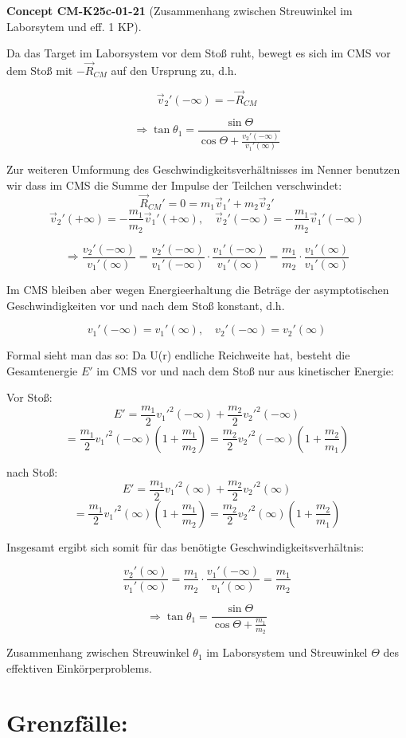 \documentclass[10pt, letterpaper]{article}
\newcommand{\CustomHeading}[3]{%
  \par\medskip\noindent%
  \textbf{#1 #2} \textnormal{(#3)}.\enskip%
}
\newenvironment{CONC}[2]{\begin{unitbox}\CustomHeading{Concept}{#1}{#2}}{\end{unitbox}}
\begin{document}
\begin{CONC}{CM-K25c-01-21}{Zusammenhang zwischen Streuwinkel im Laborsytem und eff. 1 KP}
Da das Target im Laborsystem vor dem Stoß ruht, bewegt es sich im CMS vor dem Stoß mit $-\vec{R}_{CM}$ auf den Ursprung zu, d.h.

\[\vec{v}_2'(-\infty) = -\vec{R}_{CM}\]

\[\Rightarrow \tan\theta_1 = \frac{\sin\Theta}{\cos\Theta + \frac{v_2'(-\infty)}{v_1'(\infty)}}\]

Zur weiteren Umformung des Geschwindigkeitsverhältnisses im Nenner benutzen wir dass im CMS die Summe der Impulse der Teilchen verschwindet:
\[\vec{R}_{CM}' = 0 = m_1\vec{v}_1' + m_2\vec{v}_2'\]
\[\vec{v}_2'(+\infty) = -\frac{m_1}{m_2}\vec{v}_1'(+\infty), \quad \vec{v}_2'(-\infty) = -\frac{m_1}{m_2}\vec{v}_1'(-\infty)\]

\[\Rightarrow \frac{v_2'(-\infty)}{v_1'(\infty)} = \frac{v_2'(-\infty)}{v_1'(-\infty)}\cdot\frac{v_1'(-\infty)}{v_1'(\infty)} = \frac{m_1}{m_2}\cdot\frac{v_1'(\infty)}{v_1'(\infty)}\]

Im CMS bleiben aber wegen Energieerhaltung die Beträge der asymptotischen Geschwindigkeiten vor und nach dem Stoß konstant, d.h.

\[v_1'(-\infty) = v_1'(\infty), \quad v_2'(-\infty) = v_2'(\infty)\]

Formal sieht man das so: Da U(r) endliche Reichweite hat, besteht die Gesamtenergie $E'$ im CMS vor und nach dem Stoß nur aus kinetischer Energie:

Vor Stoß:
\[E' = \frac{m_1}{2}v_1'^2(-\infty) + \frac{m_2}{2}v_2'^2(-\infty)\]
\[= \frac{m_1}{2}v_1'^2(-\infty)\left(1+\frac{m_1}{m_2}\right) = \frac{m_2}{2}v_2'^2(-\infty)\left(1+\frac{m_2}{m_1}\right)\]

nach Stoß:
\[E' = \frac{m_1}{2}v_1'^2(\infty) + \frac{m_2}{2}v_2'^2(\infty)\]
\[= \frac{m_1}{2}v_1'^2(\infty)\left(1+\frac{m_1}{m_2}\right) = \frac{m_2}{2}v_2'^2(\infty)\left(1+\frac{m_2}{m_1}\right)\]

Insgesamt ergibt sich somit für das benötigte Geschwindigkeitsverhältnis:

\[\frac{v_2'(\infty)}{v_1'(\infty)} = \frac{m_1}{m_2}\cdot\frac{v_1'(-\infty)}{v_1'(\infty)} = \frac{m_1}{m_2}\]

\[\Rightarrow \tan\theta_1 = \frac{\sin\Theta}{\cos\Theta + \frac{m_1}{m_2}}\]

Zusammenhang zwischen Streuwinkel $\theta_1$ im Laborsystem und Streuwinkel $\Theta$ des effektiven Einkörperproblems.
\end{CONC}

\section*{Grenzfälle:}
\end{document}
